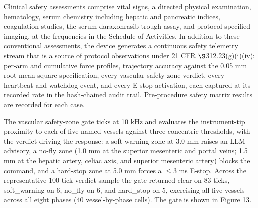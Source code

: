 Clinical safety assessments comprise vital signs, a directed physical examination,
hematology, serum chemistry including hepatic and pancreatic indices, coagulation
studies, the serum daraxonrasib trough assay, and protocol-specified imaging, at the
frequencies in the Schedule of Activities. In addition to these conventional
assessments, the device generates a continuous safety telemetry stream that is a source of protocol observations under 21 CFR $\S$312.23(g)(i)(iv): per-arm
and cumulative force profiles, trajectory accuracy against the 0.05 mm root mean
square specification, every vascular safety-zone verdict, every heartbeat and
watchdog event, and every E-stop activation, each captured at its recorded rate in
the hash-chained audit trail. Pre-procedure safety matrix results are recorded for
each case.

The vascular safety-zone gate ticks at 10 kHz and evaluates the instrument-tip
proximity to each of five named vessels against three concentric thresholds, with
the verdict driving the response: a soft-warning zone at 3.0 mm raises an LLM
advisory, a no-fly zone (1.0 mm at the superior mesenteric and portal veins; 1.5 mm
at the hepatic artery, celiac axis, and superior mesenteric artery) blocks the
command, and a hard-stop zone at 5.0 mm forces a $\leq 3$ ms E-stop. Across the
representative 100-tick verdict sample the gate returned clear on 83 ticks,
soft\_warning on 6, no\_fly on 6, and hard\_stop on 5, exercising all five vessels
across all eight phases (40 vessel-by-phase cells). The gate is shown in Figure 13.

